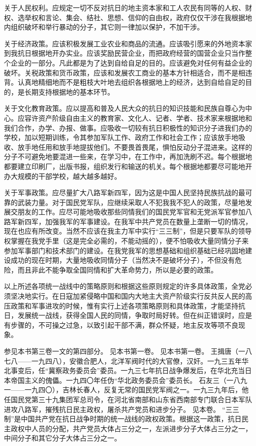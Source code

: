 关于人民权利。应规定一切不反对抗日的地主资本家和工人农民有同等的人权、财权、选举权和言论、集会、结社、思想、信仰的自由权，政府仅仅干涉在我根据地内组织破坏和举行暴动的分子，其它则一律加以保护，不加干涉。

关于经济政策。应该积极发展工业农业和商品的流通。应该吸引愿来的外地资本家到我抗日根据地开办实业。应该奖励民营企业，而把政府经营的国营企业只当作整个企业的一部分。凡此都是为了达到自给自足的目的。应该避免对任何有益企业的破坏。关税政策和货币政策，应该和发展农工商业的基本方针相适合，而不是相违背。认真地精细地而不是粗枝大叶地去组织各根据地上的经济，达到自给自足的目的，是长期支持根据地的基本环节。

关于文化教育政策。应以提高和普及人民大众的抗日的知识技能和民族自尊心为中心。应容许资产阶级自由主义的教育家、文化人、记者、学者、技术家来根据地和我们合作，办学、办报、做事。应吸收一切较有抗日积极性的知识分子进我们办的学校，加以短期训练，令其参加军队工作、政府工作和社会工作；应该放手地吸收、放手地任用和放手地提拔他们。不要畏首畏尾，惧怕反动分子混进来。这样的分子不可避免地要混进一些来，在学习中，在工作中，再加洗刷不迟。每个根据地都要建立印刷厂，出版书报，组织发行和输送的机关。每个根据地都要尽可能地开办大规模的干部学校，越大越多越好。

关于军事政策。应尽量扩大八路军新四军，因为这是中国人民坚持民族抗战的最可靠的武装力量。对于国民党军队，应继续采取人不犯我我不犯人的政策，尽量地发展交朋友的工作。应尽可能地吸收那些同情我们的国民党军官和无党派军官参加八路军新四军，加强我军的军事建设。在我军中共产党员在数量上垄断一切的情况，现在也应有所改变。当然不应该在我主力军中实行“三三制”，但是只要军队的领导权掌握在我党手里（这是完全必需的，不能动摇的），便不怕吸收大量同情分子来参加军事部门和技术部门的建设。在我党我军的思想基础和组织基础已经巩固地建设成功的现在时期，大量地吸收同情分子（当然决不是破坏分子），不但没有危险，而且非此不能争取全国同情和扩大革命势力，所以是必要的政策。

以上所述各项统一战线中的策略原则和根据这些原则规定的许多具体政策，全党必须坚决地实行。在日寇加紧侵略中国和国内大地主大资产阶级实行反共反人民的高压政策和军事进攻的时候，惟有实行上述各项策略原则和具体政策，才能坚持抗日，发展统一战线，获得全国人民的同情，争取时局好转。但在纠正错误时，应是有步骤的，不可操之过急，以致引起干部不满，群众怀疑，地主反攻等项不良现象。


\begin{maonote}
参见本书第三卷一文的第四部分。
见本书第一卷。
见本书第一卷。
王揖唐（一八七八——一九四八），安徽合肥人，北洋军阀时代的大官僚，汉奸。一九三五年华北事变后，任“冀察政务委员会”委员。一九三七年抗日战争爆发后，在华北充当日本帝国主义的傀儡。一九四〇年任伪“华北政务委员会”委员长。
石友三（一八九一——一九四〇），吉林长春人，反复无常的国民党军阀之一。一九三九年后，他任国民党第三十九集团军总司令，在河北省南部和山东省西南部专门联合日本军队进攻八路军，摧残抗日民主政权，屠杀共产党员和进步分子。
见本卷。
“三三制”是中国共产党在抗日战争时期的统一战线的政权政策。根据这一政策，抗日民主政权中人员的分配，共产党员大体占三分之一，左派进步分子大体占三分之一，中间分子和其它分子大体占三分之一。
\end{maonote}
